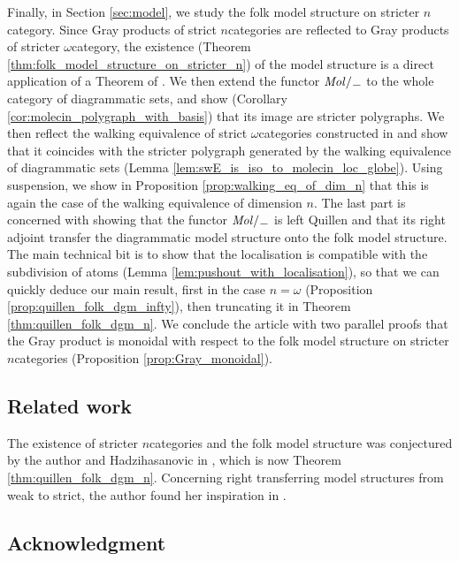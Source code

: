 Finally, in Section \ref{sec:model}, we study the folk model structure on stricter \( n \)\nbd category. 
Since Gray products of strict \( n \)\nbd categories are reflected to Gray products of stricter \( \omega \)\nbd category, the existence (Theorem \ref{thm:folk_model_structure_on_stricter_n}) of the model structure is a direct application of a Theorem of \cite{ara2025polygraphs}.
We then extend the functor \( \molecin{-} \) to the whole category of diagrammatic sets, and show (Corollary \ref{cor:molecin_polygraph_with_basis}) that its image are stricter polygraphs. 
We then reflect the walking equivalence of strict \( \omega \)\nbd categories constructed in \cite{hadzihasanovic2024model} and show that it coincides with the stricter polygraph generated by the walking equivalence of diagrammatic sets (Lemma \ref{lem:swE_is_iso_to_molecin_loc_globe}).
Using suspension, we show in Proposition \ref{prop:walking_eq_of_dim_n} that this is again the case of the walking equivalence of dimension \( n \).
The last part is concerned with showing that the functor \( \molecin{-} \) is left Quillen and that its right adjoint transfer the diagrammatic model structure onto the folk model structure.
The main technical bit is to show that the localisation is compatible with the subdivision of atoms (Lemma \ref{lem:pushout_with_localisation}), so that we can quickly deduce our main result, first in the case \( n = \omega \) (Proposition \ref{prop:quillen_folk_dgm_infty}), then truncating it in Theorem \ref{thm:quillen_folk_dgm_n}.  
We conclude the article with two parallel proofs that the Gray product is monoidal with respect to the folk model structure on stricter \( n \)\nbd categories (Proposition \ref{prop:Gray_monoidal}).  

\subsection*{Related work}

The existence of stricter \( n \)\nbd categories and the folk model structure was conjectured by the author and Hadzihasanovic in \cite[Conjecture 6.3]{chanavat2024model}, which is now Theorem \ref{thm:quillen_folk_dgm_n}.
Concerning right transferring model structures from weak to strict, the author found her inspiration in \cite{ozornova2021nerves}.

\subsection*{Acknowledgment}

